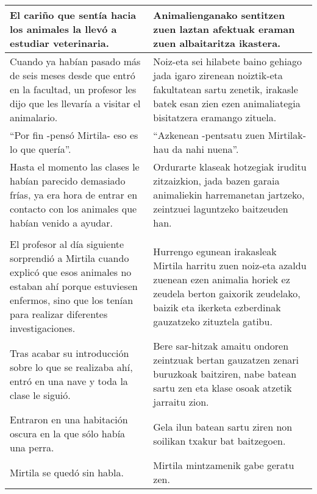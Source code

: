 \documentclass{article}
\begin{document}
\begin{center}
\begin{longtable}{|p{6cm}|p{6cm}|}
  \midrule
  El cariño que sentía hacia los animales la llevó a estudiar veterinaria.&
  Animalienganako sentitzen zuen laztan afektuak eraman zuen albaitaritza ikastera.\\

  \midrule
  Cuando ya habían pasado más de seis meses desde que entró en la facultad, un profesor les dijo que les llevaría a visitar el animalario.&
  Noiz-eta sei hilabete baino gehiago jada igaro zirenean noiztik-eta fakultatean sartu zenetik, irakasle batek esan zien ezen animaliategia bisitatzera eramango zituela.\\

  \midrule
  ``Por fin -pensó Mirtila- eso es lo que quería''.&
  ``Azkenean -pentsatu zuen Mirtilak- hau da nahi nuena''.\\

  \midrule
  Hasta el momento las clases le habían parecido demasiado frías, ya era hora de entrar en contacto con los animales que habían venido a ayudar.&
  Ordurarte klaseak hotzegiak iruditu zitzaizkion, jada bazen garaia animaliekin harremanetan jartzeko, zeintzuei laguntzeko baitzeuden han.\\

  \midrule
  \cellcolor{lightgray}{\textbf{Párrafo}} &
  \cellcolor{lightgray}{\textbf{Paragrafoa}}\\
  
  \midrule
  El profesor al día siguiente sorprendió a Mirtila cuando explicó que esos animales no estaban ahí porque estuviesen enfermos, sino que los tenían para realizar diferentes investigaciones.&
  Hurrengo egunean irakasleak Mirtila harritu zuen noiz-eta azaldu zuenean ezen animalia horiek ez zeudela berton gaixorik zeudelako, baizik eta ikerketa ezberdinak gauzatzeko zituztela gatibu.\\

  \midrule
  Tras acabar su introducción sobre lo que se realizaba ahí, entró en una nave y toda la clase le siguió.&
  Bere sar-hitzak amaitu ondoren zeintzuak bertan gauzatzen zenari buruzkoak baitziren, nabe batean sartu zen eta klase osoak atzetik jarraitu zion.\\  

  \midrule
  Entraron en una habitación oscura en la que sólo había una perra.&
  Gela ilun batean sartu ziren non soilikan txakur bat baitzegoen.\\

  \midrule
  Mirtila se quedó sin habla.&
  Mirtila mintzamenik gabe geratu zen.\\


\end{longtable}
\end{center}
\end{document}
